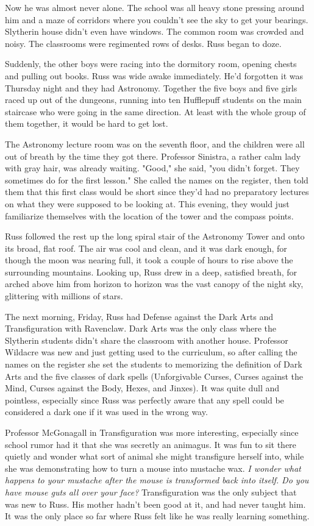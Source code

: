 Now he was almost never alone. The school was all heavy stone pressing around him and a maze of corridors where you couldn't see the sky to get your bearings. Slytherin house didn't even have windows. The common room was crowded and noisy. The classrooms were regimented rows of desks. Russ began to doze.

Suddenly, the other boys were racing into the dormitory room, opening chests and pulling out books. Russ was wide awake immediately. He'd forgotten it was Thursday night and they had Astronomy. Together the five boys and five girls raced up out of the dungeons, running into ten Hufflepuff students on the main staircase who were going in the same direction. At least with the whole group of them together, it would be hard to get lost.

The Astronomy lecture room was on the seventh floor, and the children were all out of breath by the time they got there. Professor Sinistra, a rather calm lady with gray hair, was already waiting. "Good," she said, "you didn't forget. They sometimes do for the first lesson." She called the names on the register, then told them that this first class would be short since they'd had no preparatory lectures on what they were supposed to be looking at. This evening, they would just familiarize themselves with the location of the tower and the compass points.

Russ followed the rest up the long spiral stair of the Astronomy Tower and onto its broad, flat roof. The air was cool and clean, and it was dark enough, for though the moon was nearing full, it took a couple of hours to rise above the surrounding mountains. Looking up, Russ drew in a deep, satisfied breath, for arched above him from horizon to horizon was the vast canopy of the night sky, glittering with millions of stars.

The next morning, Friday, Russ had Defense against the Dark Arts and Transfiguration with Ravenclaw. Dark Arts was the only class where the Slytherin students didn't share the classroom with another house. Professor Wildacre was new and just getting used to the curriculum, so after calling the names on the register she set the students to memorizing the definition of Dark Arts and the five classes of dark spells (Unforgivable Curses, Curses against the Mind, Curses against the Body, Hexes, and Jinxes). It was quite dull and pointless, especially since Russ was perfectly aware that any spell could be considered a dark one if it was used in the wrong way.

Professor McGonagall in Transfiguration was more interesting, especially since school rumor had it that she was secretly an animagus. It was fun to sit there quietly and wonder what sort of animal she might transfigure herself into, while she was demonstrating how to turn a mouse into mustache wax. \emph{I wonder what happens to your mustache after the mouse is transformed back into itself. Do you have mouse guts all over your face?} Transfiguration was the only subject that was new to Russ. His mother hadn't been good at it, and had never taught him. It was the only place so far where Russ felt like he was really learning something.


